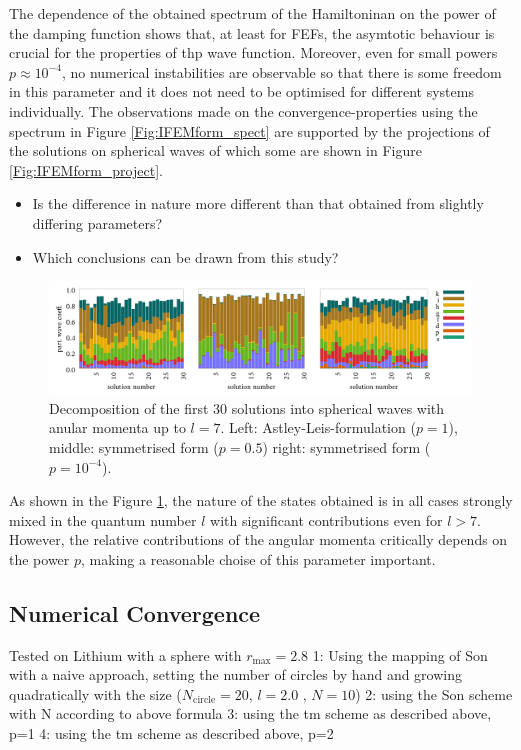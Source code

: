 The dependence of the obtained spectrum of the Hamiltoninan on the power of the damping function shows that, at least for FEFs, the asymtotic behaviour is crucial for the properties of thp wave function. 
Moreover, even for small powers $p\approx 10^{-4}$, no numerical instabilities are observable so that there is some freedom in this parameter and it does not need to be optimised for different systems individually.
The observations made on the convergence-properties using the spectrum in Figure \ref{Fig:IFEMform_spect} are supported by the projections of the solutions on spherical waves of which some are shown in Figure \ref{Fig:IFEMform_project}.
\begin{itemize}
   \item Is the difference in nature more different than that obtained from slightly
         differing parameters?
   \item Which conclusions can be drawn from this study?
\end{itemize}
\begin{figure}
\includegraphics[width=\textwidth]{Figures/Ifem_forms}
\caption{Decomposition of the first 30 solutions into spherical waves with anular momenta up to $l=7$.
Left: Astley-Leis-formulation ($p=1$), middle: symmetrised form ($p=0.5$) right: symmetrised form ($p=10^{-4}$).}
\label{fig:IFEMform_project}
\end{figure}

As shown in the Figure \ref{fig:IFEMform_project}, the nature of the states obtained is in all cases strongly mixed in the quantum number $l$ with significant contributions even for $l>7$.
However, the relative contributions of the angular momenta critically depends on the power $p$, making a reasonable choise of this parameter important.

\subsection{Numerical Convergence}
Tested on Lithium with a sphere with $r_\text{max}=2.8$
1:  Using the mapping of Son with a naive approach, setting the number of circles by hand and growing quadratically with the size  ($N_\text{circle}=20$, $l= 2.0$ , $N= 10$)
2: using the Son scheme with N according to above formula
3: using the tm scheme as described above, p=1
4: using the tm scheme as described above, p=2

